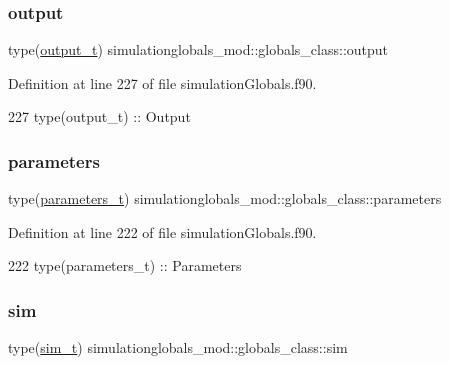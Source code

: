 \subsubsection{\texorpdfstring{output}{output}}
{\footnotesize\ttfamily type(\mbox{\hyperlink{structsimulationglobals__mod_1_1output__t}{output\+\_\+t}}) simulationglobals\+\_\+mod\+::globals\+\_\+class\+::output\hspace{0.3cm}{\ttfamily [private]}}



Definition at line 227 of file simulation\+Globals.\+f90.


\begin{DoxyCode}
227         \textcolor{keywordtype}{type}(output\_t)      :: Output
\end{DoxyCode}
\mbox{\label{structsimulationglobals__mod_1_1globals__class_a6cf7f7fdf4c9f17c57bed07fea62be6a}} 
\subsubsection{\texorpdfstring{parameters}{parameters}}
{\footnotesize\ttfamily type(\mbox{\hyperlink{structsimulationglobals__mod_1_1parameters__t}{parameters\+\_\+t}}) simulationglobals\+\_\+mod\+::globals\+\_\+class\+::parameters\hspace{0.3cm}{\ttfamily [private]}}



Definition at line 222 of file simulation\+Globals.\+f90.


\begin{DoxyCode}
222         \textcolor{keywordtype}{type}(parameters\_t)  :: Parameters
\end{DoxyCode}
\mbox{\label{structsimulationglobals__mod_1_1globals__class_a4cfce0f16210a73a43b5b0420a77d521}} 
\subsubsection{\texorpdfstring{sim}{sim}}
{\footnotesize\ttfamily type(\mbox{\hyperlink{structsimulationglobals__mod_1_1sim__t}{sim\+\_\+t}}) simulationglobals\+\_\+mod\+::globals\+\_\+class\+::sim\hspace{0.3cm}{\ttfamily [private]}}



